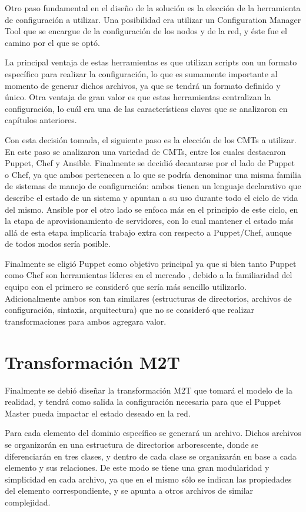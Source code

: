 Otro paso fundamental en el diseño de la solución es la elección de la herramienta de configuración a utilizar. Una posibilidad era utilizar un Configuration Manager Tool que se encargue de la configuración de los nodos y de la red, y éste fue el camino por el que se optó. 

La principal ventaja de estas herramientas es que utilizan scripts con un formato específico para realizar la configuración, lo que es sumamente importante al momento de generar dichos archivos, ya que se tendrá un formato definido y único. Otra ventaja de gran valor es que estas herramientas centralizan la configuración, lo cuál era una de las características claves que se analizaron en capítulos anteriores.

Con esta decisión tomada, el siguiente paso es la elección de los CMTs a utilizar. En este paso se analizaron una variedad de CMTs, entre los cuales destacaron Puppet, Chef y Ansible. Finalmente se decidió decantarse por el lado de Puppet o Chef, ya que ambos pertenecen a lo que se podría denominar una misma familia de sistemas de manejo de configuración: ambos tienen un lenguaje declarativo que describe el estado de un sistema y apuntan a su uso durante todo el ciclo de vida del mismo. Ansible por el otro lado se enfoca más en el principio de este ciclo, en la etapa de aprovisionamiento de servidores, con lo cual mantener el estado más allá de esta etapa implicaría trabajo extra con respecto a Puppet/Chef, aunque de todos modos sería posible.

Finalmente se eligió Puppet como objetivo principal ya que si bien tanto Puppet como Chef son herramientas líderes en el mercado \cite{puppetmarket}, debido a la familiaridad del equipo con el primero se consideró que sería más sencillo utilizarlo. Adicionalmente ambos son tan similares (estructuras de directorios, archivos de configuración, sintaxis, arquitectura) que no se consideró que realizar transformaciones para ambos agregara valor.

\section{Transformación M2T}

Finalmente se debió diseñar la transformación M2T que tomará el modelo de la realidad, y tendrá como salida la configuración necesaria para que el Puppet Master pueda impactar el estado deseado en la red.

Para cada elemento del dominio específico se generará un archivo. Dichos archivos se organizarán en una estructura de directorios arborescente, donde se diferenciarán en tres clases, y dentro de cada clase se organizarán en base a cada elemento y sus relaciones.
De este modo se tiene una gran modularidad y simplicidad en cada archivo, ya que en el mismo sólo se indican las propiedades del elemento correspondiente, y se apunta a otros archivos de similar complejidad.

